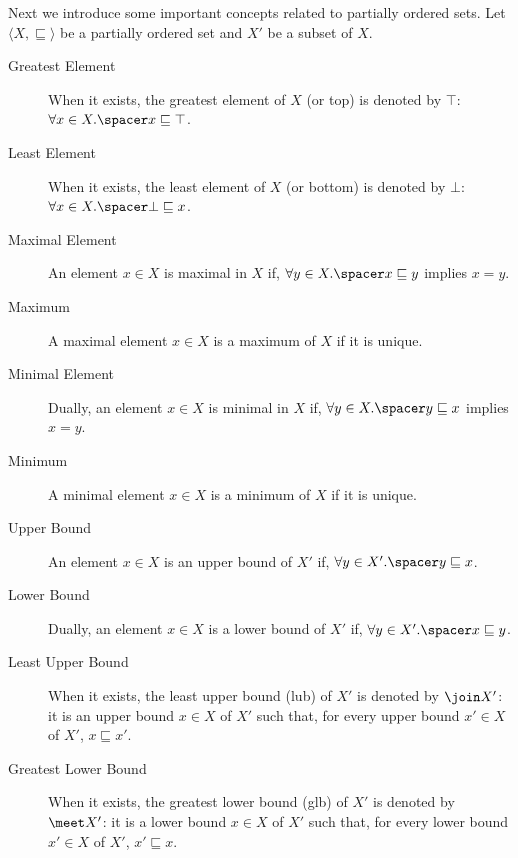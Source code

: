 Next we introduce some important concepts related to partially ordered sets.
Let $\langle X, \sqsubseteq \rangle$ be a partially ordered set and $X'$ be a subset of $X$.
\begin{description}
  \item[Greatest Element] When it exists, the greatest element of $X$ (or top) is denoted by $\top$: $\forall x \in X.\spacer x \sqsubseteq \top$.
  \item[Least Element] When it exists, the least element of $X$ (or bottom) is denoted by $\bot$: $\forall x \in X.\spacer \bot \sqsubseteq x$.
  \item[Maximal Element] An element $x \in X$ is maximal in $X$ if, $\forall y \in X.\spacer x \sqsubseteq y$ implies $x = y$.
  \item[Maximum] A maximal element $x \in X$ is a maximum of $X$ if it is unique.
  \item[Minimal Element] Dually, an element $x \in X$ is minimal in $X$ if, $\forall y \in X.\spacer y \sqsubseteq x$ implies $x = y$.
  \item[Minimum] A minimal element $x \in X$ is a minimum of $X$ if it is unique.
  \item[Upper Bound] An element $x \in X$ is an upper bound of $X'$ if, $\forall y \in X'.\spacer y \sqsubseteq x$.
  \item[Lower Bound] Dually, an element $x \in X$ is a lower bound of $X'$ if, $\forall y \in X'.\spacer x \sqsubseteq y$.
  \item[Least Upper Bound] When it exists, the least upper bound (lub) of $X'$ is denoted by $\join X'$: it is an upper bound $x \in X$ of $X'$ such that, for every upper bound $x' \in X$ of $X'$, $x \sqsubseteq x'$.
  \item[Greatest Lower Bound] When it exists, the greatest lower bound (glb) of $X'$ is denoted by $\meet X'$: it is a lower bound $x \in X$ of $X'$ such that, for every lower bound $x' \in X$ of $X'$, $x' \sqsubseteq x$.
\end{description}

